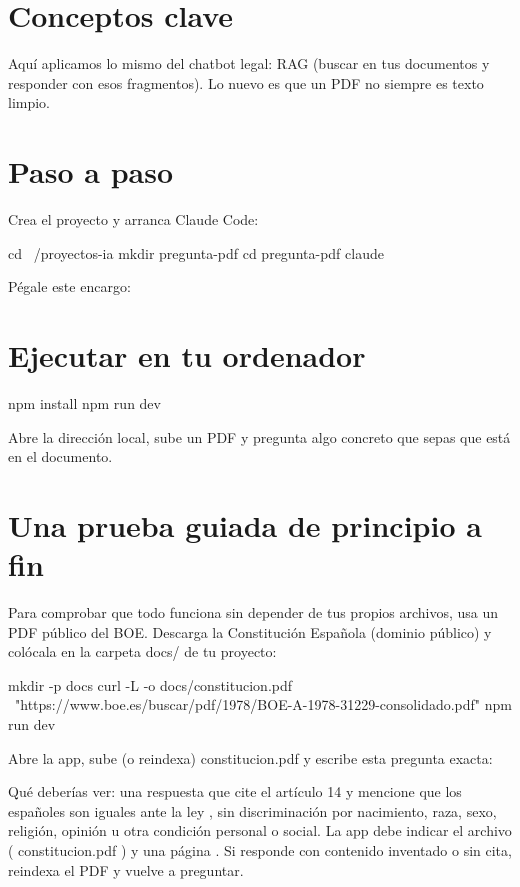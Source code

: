 \documentclass[11pt,a4paper]{book}
\begin{document}
\section{Conceptos clave}
Aquí aplicamos lo mismo del chatbot legal: RAG (buscar en tus documentos y responder con esos fragmentos). Lo nuevo es que un PDF no siempre es texto limpio.

\section{Paso a paso}
Crea el proyecto y arranca Claude Code:

\begin{codebox}
cd ~/proyectos-ia
mkdir pregunta-pdf
cd pregunta-pdf
claude
\end{codebox}
Pégale este encargo:

\section{Ejecutar en tu ordenador}
\begin{codebox}
npm install
npm run dev
\end{codebox}
Abre la dirección local, sube un PDF y pregunta algo concreto que sepas que está en el documento.

\section{Una prueba guiada de principio a fin}
Para comprobar que todo funciona sin depender de tus propios archivos, usa un PDF público del BOE. Descarga la Constitución Española (dominio público) y colócala en la carpeta docs/ de tu proyecto:

\begin{codebox}
mkdir -p docs
curl -L -o docs/constitucion.pdf \
  "https://www.boe.es/buscar/pdf/1978/BOE-A-1978-31229-consolidado.pdf"
npm run dev
\end{codebox}
Abre la app, sube (o reindexa) constitucion.pdf y escribe esta pregunta exacta:

Qué deberías ver: una respuesta que cite el artículo 14 y mencione que los españoles son iguales ante la ley , sin discriminación por nacimiento, raza, sexo, religión, opinión u otra condición personal o social. La app debe indicar el archivo ( constitucion.pdf ) y una página . Si responde con contenido inventado o sin cita, reindexa el PDF y vuelve a preguntar.
\end{document}
